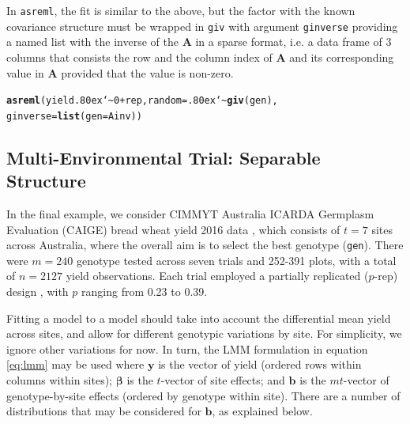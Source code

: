 \documentclass[runningheads]{llncs}\usepackage[]{graphicx}\usepackage[]{color}
\makeatletter
\newcommand{\hlnum}[1]{\textcolor[rgb]{0.686,0.059,0.569}{#1}}%
\newcommand{\hlopt}[1]{\textcolor[rgb]{0,0,0}{#1}}%
\newcommand{\hlstd}[1]{\textcolor[rgb]{0.345,0.345,0.345}{#1}}%
\newcommand{\hlkwc}[1]{\textcolor[rgb]{0.333,0.667,0.333}{#1}}%
\newcommand{\hlkwd}[1]{\textcolor[rgb]{0.737,0.353,0.396}{\textbf{#1}}}%
\newenvironment{kframe}{%
 \def\at@end@of@kframe{}%
 \ifinner\ifhmode%
  \def\at@end@of@kframe{\end{minipage}}%
  \begin{minipage}{\columnwidth}%
 \fi\fi%
 \def\FrameCommand##1{\hskip\@totalleftmargin \hskip-\fboxsep
 \colorbox{shadecolor}{##1}\hskip-\fboxsep
     \hskip-\linewidth \hskip-\@totalleftmargin \hskip\columnwidth}%
 \MakeFramed {\advance\hsize-\width
   \@totalleftmargin\z@ \linewidth\hsize
   \@setminipage}}%
 {\par\unskip\endMakeFramed%
 \at@end@of@kframe}
\newenvironment{knitrout}{}{} %
\newcommand{\mytilde}{\lower.80ex\hbox{\char`\~}}
\makeatother
\begin{document}
In \texttt{asreml}, the fit is similar to the above, but the factor with the known covariance structure must be wrapped in \texttt{giv} with argument \texttt{ginverse} providing a named list with the inverse of the $\mathbf{A}$ in a sparse format, i.e. a data frame of 3 columns that consists the row and the column index of $\mathbf{A}$ and its corresponding value in $\mathbf{A}$ provided that the value is non-zero.

\begin{knitrout}
	\color{fgcolor}\begin{kframe}
		\begin{alltt}
			\hlkwd{asreml}\hlstd{(yield} \hlopt{\mytilde} \hlnum{0} \hlopt{+} \hlstd{rep,} \hlkwc{random} \hlstd{=} \hlopt{\mytilde}\hlkwd{giv}\hlstd{(gen),}
			\hlkwc{ginverse} \hlstd{=} \hlkwd{list}\hlstd{(}\hlkwc{gen} \hlstd{= Ainv))}
		\end{alltt}
	\end{kframe}
\end{knitrout}

\hypertarget{MET}{%
	\subsection{Multi-Environmental Trial: Separable Structure}\label{MET}}

In the final example, we consider CIMMYT Australia ICARDA Germplasm Evaluation (CAIGE) bread wheat yield 2016 data \citep{CAIGE2016}, which consists of $t=7$ sites across Australia, where the overall aim is to select the best genotype (\texttt{gen}). There were $m=240$ genotype tested across seven trials and 252-391 plots, with a total of $n=2127$ yield observations. Each trial employed a partially replicated ($p$-rep) design \citep{Cullis2006}, with $p$ ranging from 0.23 to 0.39.

Fitting a model to a model should take into account the differential mean yield across sites, and allow for different genotypic variations by site. For simplicity, we ignore other variations for now. In turn, the LMM formulation in equation \eqref{eq:lmm} may be used where $\boldsymbol{y}$ is the vector of yield (ordered rows within columns within sites); $\boldsymbol{\beta}$ is the $t$-vector of site effects; and $\boldsymbol{b}$ is the $mt$-vector of genotype-by-site effects (ordered by genotype within site). There are a number of distributions that may be considered for $\boldsymbol{b}$, as explained below.
\end{document}
